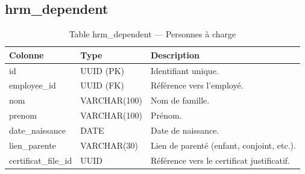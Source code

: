 \documentclass[a4paper,12pt,openany]{book}
\begin{document}
    \subsection{hrm\_dependent}
    \begin{table}[H]
        \centering
        \caption{Table hrm\_dependent — Personnes à charge}
        \begin{tabularx}{\textwidth}{llX}
    \toprule
    \textbf{Colonne} & \textbf{Type} & \textbf{Description} \\
    \midrule
    id               & UUID (PK)     & Identifiant unique. \\
    employee\_id     & UUID (FK)     & Référence vers l'employé. \\
    nom              & VARCHAR(100)  & Nom de famille. \\
    prenom           & VARCHAR(100)  & Prénom. \\
    date\_naissance  & DATE          & Date de naissance. \\
    lien\_parente    & VARCHAR(30)   & Lien de parenté (enfant, conjoint, etc.). \\
    certificat\_file\_id & UUID      & Référence vers le certificat justificatif. \\
    \bottomrule
        \end{tabularx}
    \end{table}
\end{document}
